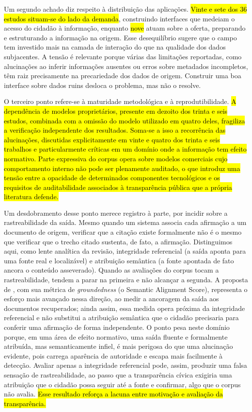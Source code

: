 \documentclass[brazilian]{sbc2025}
\newif\ifhl \hltrue
\newcommand{\rev}[1]{\ifhl\sethlcolor{yellow}\hl{#1}\else#1\fi}
\begin{document}
Um segundo achado diz respeito à distribuição das aplicações. \rev{Vinte e sete dos 36 estudos situam-se do lado da demanda}, construindo interfaces que medeiam o acesso do cidadão à informação, enquanto \rev{nove} atuam sobre a oferta, preparando e estruturando a informação na origem. Esse desequilíbrio sugere que o campo tem investido mais na camada de interação do que na qualidade dos dados subjacentes. A tensão é relevante porque várias das limitações reportadas, como alucinações ao inferir informações ausentes ou erros sobre metadados incompletos, têm raiz precisamente na precariedade dos dados de origem. Construir uma boa interface sobre dados ruins desloca o problema, mas não o resolve.

O terceiro ponto refere-se à maturidade metodológica e à reprodutibilidade. \rev{A dependência de modelos proprietários, presente em dezoito dos trinta e seis estudos, combinada com a omissão do modelo utilizado em quatro deles, fragiliza a verificação independente dos resultados. Soma-se a isso a recorrência das alucinações, discutidas explicitamente em vinte e quatro dos trinta e seis trabalhos e particularmente críticas em um domínio onde a informação tem efeito normativo. Parte expressiva do corpus opera sobre modelos comerciais cujo comportamento interno não pode ser plenamente auditado, o que introduz uma tensão entre a opacidade de determinados componentes tecnológicos e os requisitos de auditabilidade associados à transparência pública que a própria literatura defende.}

Um desdobramento desse ponto merece registro à parte, por incidir sobre a rastreabilidade da saída. Mesmo quando um sistema associa cada afirmação a um documento de origem, verificar que a citação existe formalmente não é o mesmo que verificar que o trecho citado sustenta, de fato, a afirmação. Distinguimos aqui, como lente analítica da revisão, integridade referencial (a saída aponta para uma fonte real e localizável) e atribuição semântica (a fonte apontada de fato ancora o conteúdo asseverado). Quando as avaliações do corpus tocam a rastreabilidade, tendem a parar na primeira e não alcançar a segunda. A proposta de \citet{Widiyaningtyas2026}, com sua métrica de \emph{groundedness} (o Semantic Alignment Score), representa o esforço mais avançado nessa direção, ao medir a ancoragem da saída aos documentos recuperados; ainda assim, essa medida opera próxima da integridade referencial e não substitui a atribuição semântica que o cidadão precisaria para conferir uma afirmação de forma independente. O ponto pesa neste domínio porque, em uma área de efeito normativo, uma saída fluente e formalmente atribuída, mas semanticamente infiel, é mais perigosa do que uma alucinação evidente, pois carrega aparência de autoridade e escapa mais facilmente à detecção. Avaliar apenas a integridade referencial pode, assim, produzir uma falsa sensação de rastreabilidade, ao passo que a transparência cívica exigiria uma atribuição que o cidadão possa seguir até a fonte e confirmar, algo que o corpus não avalia. \rev{Esse resultado reforça a lacuna entre motivação e avaliação da transparência.}
\end{document}
